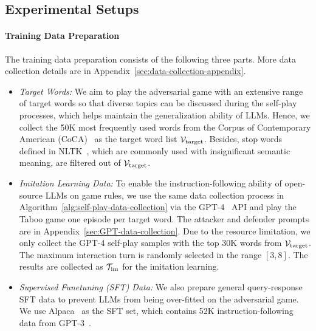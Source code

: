 \documentclass{article}
\theoremstyle{plain}
\theoremstyle{definition}
\theoremstyle{remark}
\begin{document}

\vspace{-2mm}
\subsection{Experimental Setups}
\vspace{-2mm}

\paragraph{Training Data Preparation}
The training data preparation consists of the following three parts. More data collection details are in Appendix~\ref{sec:data-collection-appendix}.
\begin{itemize}[leftmargin=14pt]
\vspace{-0.5mm}
\item \textit{Target Words: } 
We aim to play the adversarial game with an extensive range of target words so that diverse topics can be discussed during the self-play processes, which helps maintain the generalization ability of LLMs. Hence, we collect the 50K most frequently used words from the Corpus of Contemporary American (CoCA)~\citep{davies_coca_2019}  as the target word list ${\mathcal{V}}_\text{target}$. Besides, stop words defined in NLTK~\citep{bird2006nltk}, which are commonly used with insignificant semantic meaning, are filtered out of  ${\mathcal{V}}_\text{target}$.
\item \textit{Imitation Learning Data: } 
To enable the instruction-following ability of open-source LLMs on game rules, we use the same data collection process in Algorithm~\ref{alg:self-play-data-collection} via the GPT-4~\citep{openai2022gpt4} API and play the Taboo game one episode per target word. The attacker and defender prompts are in Appendix~\ref{sec:GPT-data-collection}. Due to the resource limitation, we only collect the GPT-4 self-play samples with the top 30K words from ${\mathcal{V}}_\text{target}$. The maximum interaction turn is randomly selected in the range $[3, 8]$.  The results are collected as ${\mathcal{T}}_\text{im}$ for the imitation learning.
\item \textit{Supervised Funetuning (SFT) Data: } We also prepare general query-response SFT data to prevent LLMs from being over-fitted on the adversarial game. We use Alpaca~\citep{alpaca} as the SFT set, which contains 52K instruction-following data from GPT-3~\citep{brown2020language}. 
\end{itemize}
 
\end{document}
